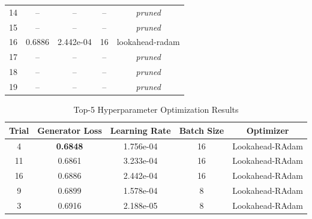 \documentclass[a4paper, journal]{IEEEtran}
\begin{document}
\begin{table}[!htbp]
\begin{tabular}{@{}ccccc@{}}
        14             & --                      & --                     & --                  & \textit{pruned}    \\
        15             & --                      & --                     & --                  & \textit{pruned}    \\
        16             & 0.6886                  & 2.442e-04              & 16                  & lookahead-radam    \\
        17             & --                      & --                     & --                  & \textit{pruned}    \\
        18             & --                      & --                     & --                  & \textit{pruned}    \\
        19             & --                      & --                     & --                  & \textit{pruned}    \\
        \bottomrule
    \end{tabular}
\end{table}



\begin{table}[!htbp]
    \tiny
    \centering
    \caption{Top-5 Hyperparameter Optimization Results}
    \label{tab:hyperparameter_results}
    \begin{tabular}{@{}ccccc@{}}
        \toprule
        \textbf{Trial} & \textbf{Generator Loss} & \textbf{Learning Rate} & \textbf{Batch Size} & \textbf{Optimizer} \\
        \midrule
        4              & \textbf{0.6848}         & 1.756e-04              & 16                  & Lookahead-RAdam    \\
        11             & 0.6861                  & 3.233e-04              & 16                  & Lookahead-RAdam    \\
        16             & 0.6886                  & 2.442e-04              & 16                  & Lookahead-RAdam    \\
        9              & 0.6899                  & 1.578e-04              & 8                   & Lookahead-RAdam    \\
        3              & 0.6916                  & 2.188e-05              & 8                   & Lookahead-RAdam    \\
        \bottomrule
    \end{tabular}
\end{table}
\end{document}
